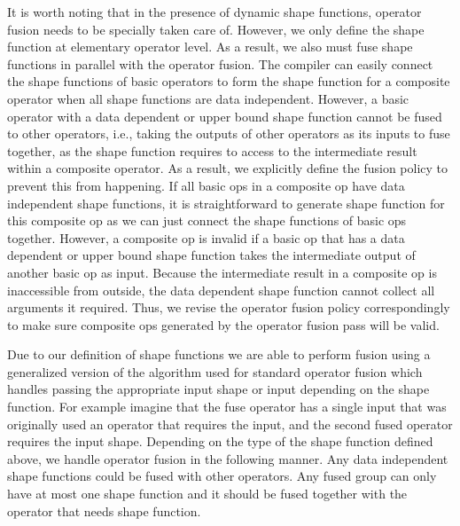 It is worth noting that in the presence of dynamic shape functions,
  operator fusion needs to be specially taken care of.
However, we only define the shape function at elementary operator level.
As a result, we also must fuse shape functions in parallel with the operator fusion.
The compiler can easily connect the shape functions of basic operators to form the shape
  function for a composite operator when all shape functions are data independent.
However, a basic operator with a data dependent or upper bound shape function cannot be fused to other operators,
  i.e., taking the outputs of other operators as its inputs to fuse together,
  as the shape function requires to access to the intermediate result within a composite operator.
As a result, we explicitly define the fusion policy to prevent this from happening.
If all basic ops in a composite op have data independent shape functions,
  it is straightforward to generate shape function for this composite op
  as we can just connect the shape functions of basic ops together.
However, a composite op is invalid if a basic op that has a data dependent
  or upper bound shape function takes the intermediate output of another basic op as input.
Because the intermediate result in a composite op is inaccessible from outside,
  the data dependent shape function cannot collect all arguments it required.
Thus, we revise the operator fusion policy correspondingly to make sure
  composite ops generated by the operator fusion pass will be valid.

Due to our definition of shape functions we are able to perform fusion
  using a generalized version of the algorithm used for standard operator fusion
  which handles passing the appropriate input shape or input depending on the shape function.
For example imagine that the fuse operator has a single input that was originally
  used an operator that requires the input, and the second fused operator requires the input shape.
Depending on the type of the shape function defined above, we handle operator fusion in the following manner.
Any data independent shape functions could be fused with other operators.
Any fused group can only have at most one shape function and it should be fused together with the operator that needs shape function.
